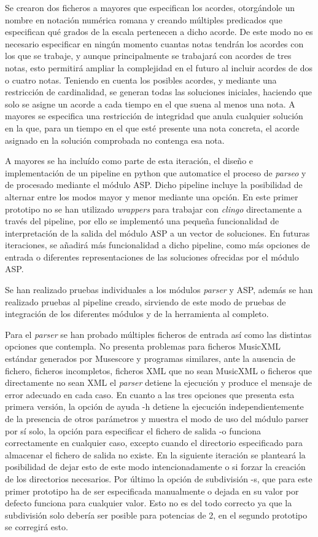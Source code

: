 Se crearon dos ficheros a mayores que especifican los acordes, otorgándole un nombre en notación numérica romana y creando múltiples predicados que especifican qué grados de la escala pertenecen a dicho acorde. De este modo no es necesario especificar en ningún momento cuantas notas tendrán los acordes con los que se trabaje, y aunque principalmente se trabajará con acordes de tres notas, esto permitirá ampliar la complejidad en el futuro al incluir acordes de dos o cuatro notas. Teniendo en cuenta los posibles acordes, y mediante una restricción de cardinalidad, se generan todas las soluciones iniciales, haciendo que solo se asigne un acorde a cada tiempo en el que suena al menos una nota. A mayores se especifica una restricción de integridad que anula cualquier solución en la que, para un tiempo en el que esté presente una nota concreta, el acorde asignado en la solución comprobada no contenga esa nota. 

A mayores se ha incluído como parte de esta iteración, el diseño e implementación de un pipeline en python que automatice el proceso de \textit{parseo} y de procesado mediante el módulo ASP. Dicho pipeline incluye la posibilidad de alternar entre los modos mayor y menor mediante una opción. En este primer prototipo no se han utilizado \textit{wrappers} para trabajar con \textit{clingo} directamente a través del pipeline, por ello se implementó una pequeña funcionalidad de interpretación de la salida del módulo ASP a un vector de soluciones. En futuras iteraciones, se añadirá más funcionalidad a dicho pipeline, como más opciones de entrada o diferentes representaciones de las soluciones ofrecidas por el módulo ASP.

Se han realizado pruebas individuales a los módulos \textit{parser} y ASP, además se han realizado pruebas al pipeline creado, sirviendo de este modo de pruebas de integración de los diferentes módulos y de la herramienta al completo.

Para el \textit{parser} se han probado múltiples ficheros de entrada así como las distintas opciones que contempla. No presenta problemas para ficheros MusicXML estándar generados por Musescore y programas similares, ante la ausencia de fichero, ficheros incompletos, ficheros XML que no sean MusicXML o ficheros que directamente no sean XML el \textit{parser} detiene la ejecución y produce el mensaje de error adecuado en cada caso. En cuanto a las tres opciones que presenta esta primera versión, la opción de ayuda -h detiene la ejecución independientemente de la presencia de otros parámetros y muestra el modo de uso del módulo parser por sí solo, la opción para especificar el fichero de salida -o funciona correctamente en cualquier caso, excepto cuando el directorio especificado para almacenar el fichero de salida no existe. En la siguiente iteración se planteará la posibilidad de dejar esto de este modo intencionadamente o si forzar la creación de los directorios necesarios. Por último la opción de subdivisión -s, que para este primer prototipo ha de ser especificada manualmente o dejada en su valor por defecto funciona para cualquier valor. Esto no es del todo correcto ya que la subdivisión solo debería ser posible para potencias de 2, en el segundo prototipo se corregirá esto.

